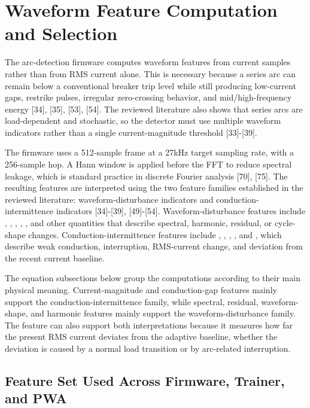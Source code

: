 \section{Waveform Feature Computation and Selection}
\label{sec:ch3-waveform-features}

The arc-detection firmware computes waveform features from current samples
rather than from RMS current alone. This is necessary because a series arc can
remain below a conventional breaker trip level while still producing
low-current gaps, restrike pulses, irregular zero-crossing behavior, and
mid/high-frequency energy [34], [35], [53], [54]. The reviewed literature also
shows that series arcs are load-dependent and stochastic, so the detector must
use multiple waveform indicators rather than a single current-magnitude
threshold [33]-[39].

The firmware uses a 512-sample frame at a 27kHz target sampling rate, with a
256-sample hop. A Hann window is applied before the FFT to reduce spectral
leakage, which is standard practice in discrete Fourier analysis [70], [75].
The resulting features are interpreted using the two feature families
established in the reviewed literature: waveform-disturbance indicators and
conduction-intermittence indicators [34]-[39], [49]-[54].
Waveform-disturbance features include ,
, , ,
, and other quantities that describe spectral,
harmonic, residual, or cycle-shape changes. Conduction-intermittence features
include , ,
, , and
, which describe weak conduction,
interruption, RMS-current change, and deviation from the recent current
baseline.

The equation subsections below group the computations according to their main
physical meaning. Current-magnitude and conduction-gap features mainly support
the conduction-intermittence family, while spectral, residual, waveform-shape,
and harmonic features mainly support the waveform-disturbance family. The
feature  can also support both
interpretations because it measures how far the present RMS current deviates
from the adaptive baseline, whether the deviation is caused by a normal load
transition or by arc-related interruption.

\subsection{Feature Set Used Across Firmware, Trainer, and PWA}
\label{sec:ch3-feature-contract}

